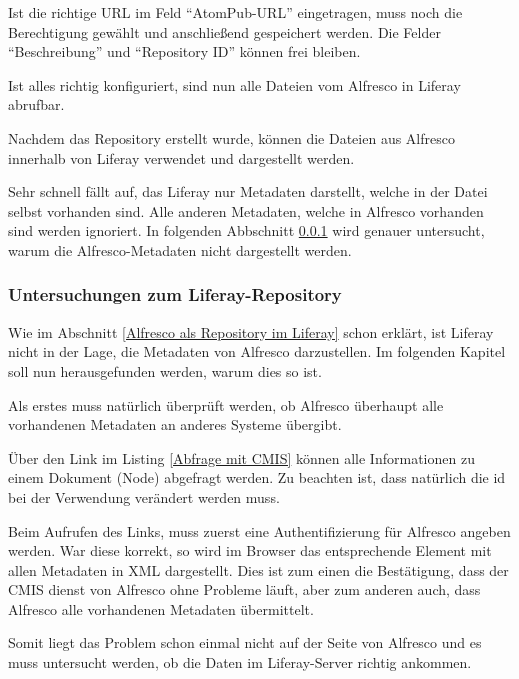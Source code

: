 Ist die richtige URL im Feld "`AtomPub-URL"' eingetragen, muss noch die Berechtigung gew\"ahlt und anschlie\ss{}end gespeichert werden. Die Felder "`Beschreibung"' und "`Repository ID"' k\"onnen frei bleiben.

Ist alles richtig konfiguriert, sind nun alle Dateien vom Alfresco in Liferay abrufbar. \cite{CMIS_Repo}

Nachdem das Repository erstellt wurde, k\"onnen die Dateien aus Alfresco innerhalb von Liferay verwendet und dargestellt werden.

Sehr schnell f\"allt auf, das Liferay nur Metadaten darstellt, welche in der Datei selbst vorhanden sind. Alle anderen Metadaten, welche in Alfresco vorhanden sind werden ignoriert. In folgenden Abbschnitt \ref{Untersuchungen zum Liferay-Repository} wird genauer untersucht, warum die Alfresco-Metadaten nicht dargestellt werden. \cite{Intregrate_as_Repo}

\subsubsection{Untersuchungen zum Liferay-Repository}\label{Untersuchungen zum Liferay-Repository}
Wie im Abschnitt \ref{Alfresco als Repository im Liferay} schon erkl\"art, ist Liferay nicht in der Lage, die Metadaten von Alfresco darzustellen. Im folgenden Kapitel soll nun herausgefunden werden, warum dies so ist.

Als erstes muss nat\"urlich \"uberpr\"uft werden, ob Alfresco \"uberhaupt alle vorhandenen Metadaten an anderes Systeme \"ubergibt.

\"Uber den Link im Listing \ref{Abfrage mit CMIS} k\"onnen alle Informationen zu einem Dokument (Node) abgefragt werden. Zu beachten ist, dass nat\"urlich die id bei der Verwendung ver\"andert werden muss. \cite{GetNodeInfo}



Beim Aufrufen des Links, muss zuerst eine Authentifizierung f\"ur Alfresco angeben werden. War diese korrekt, so wird im Browser das entsprechende Element mit allen Metadaten in XML dargestellt. Dies ist zum einen die Best\"atigung, dass der CMIS dienst von Alfresco ohne Probleme l\"auft, aber zum anderen auch, dass Alfresco alle vorhandenen Metadaten \"ubermittelt.

Somit liegt das Problem schon einmal nicht auf der Seite von Alfresco und es muss untersucht werden, ob die Daten im Liferay-Server richtig ankommen.

